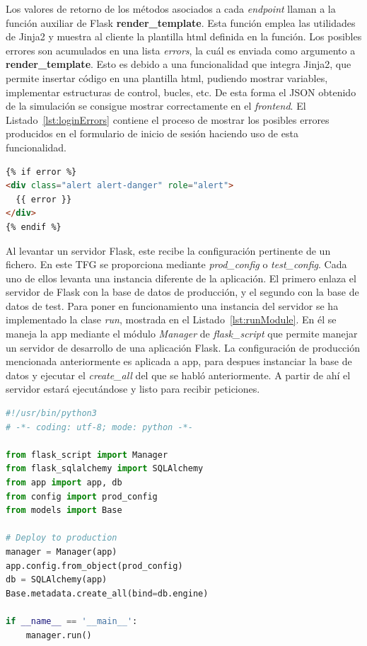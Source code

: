 Los valores de retorno de los métodos asociados a cada \textit{endpoint} llaman a la función auxiliar de Flask \textbf{render\_template}. Esta función emplea las utilidades de Jinja2 y muestra al cliente la plantilla html definida en la función.
Los posibles errores son acumulados en una lista \textit{errors}, la cuál es enviada como argumento a \textbf{render\_template}. Esto es debido a una funcionalidad que integra Jinja2, que permite insertar código en una plantilla html, pudiendo mostrar variables, implementar estructuras de control, bucles, etc. De esta forma el \gls{JSON} obtenido de la simulación se consigue mostrar correctamente en el \textit{frontend}. El Listado~\ref{lst:loginErrors} contiene el proceso de mostrar los posibles errores producidos en el formulario de inicio de sesión haciendo uso de esta funcionalidad.
\begin{lstlisting}[language=Html,float=ht,caption={Muestreo de errores en el formulario de inicio de sesión},label={lst:loginErrors}]
{% if error %}
<div class="alert alert-danger" role="alert">
  {{ error }}
</div>
{% endif %}
\end{lstlisting}

Al levantar un servidor Flask, este recibe la configuración pertinente de un fichero. En este \gls{TFG} se proporciona mediante \textit{prod\_config} o \textit{test\_config}. Cada uno de ellos levanta una instancia diferente de la aplicación. El primero enlaza el servidor de Flask con la base de datos de producción, y el segundo con la base de datos de test. Para poner en funcionamiento una instancia del servidor se ha implementado la clase \textit{run}, mostrada en el Listado~\ref{lst:runModule}. En él se maneja la app mediante el módulo \textit{Manager} de \textit{flask\_script} que permite manejar un servidor de desarrollo de una aplicación Flask. La configuración de producción mencionada anteriormente es aplicada a app, para despues instanciar la base de datos y ejecutar el \textit{create\_all} del que se habló anteriormente. A partir de ahí el servidor estará ejecutándose y listo para recibir peticiones.

\begin{lstlisting}[language=Python,float=ht,numbers=none,caption={Módulo \textit{run} para arrancar el servidor},label={lst:runModule}]
#!/usr/bin/python3
# -*- coding: utf-8; mode: python -*-

from flask_script import Manager
from flask_sqlalchemy import SQLAlchemy
from app import app, db
from config import prod_config
from models import Base

# Deploy to production
manager = Manager(app)
app.config.from_object(prod_config)
db = SQLAlchemy(app)
Base.metadata.create_all(bind=db.engine)

if __name__ == '__main__':
    manager.run()
\end{lstlisting}

